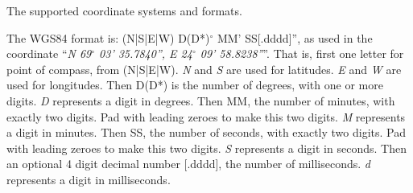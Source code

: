The supported coordinate systems and formats.

The WGS84 format is: (N|S|E|W) D(D*)$^{\circ}$ MM' SS[.dddd]'', as used in the coordinate ``\emph{N 69$^{\circ}$ 03' 35.7840'', E 24$^{\circ}$ 09' 58.8238''}''.
That is, first one letter for point of compass, from (N|S|E|W).
\emph{N} and \emph{S} are used for latitudes. \emph{E} and \emph{W} are used for longitudes.
Then D(D*) is the number of degrees, with one or more digits.
\emph{D} represents a digit in degrees.
Then MM, the number of minutes, with exactly two digits. Pad with leading zeroes to make this two digits.
\emph{M} represents a digit in minutes.
Then SS, the number of seconds, with exactly two digits. Pad with leading zeroes to make this two digits.
\emph{S} represents a digit in seconds.
Then an optional 4 digit decimal number [.dddd], the number of milliseconds.
\emph{d} represents a digit in milliseconds.

